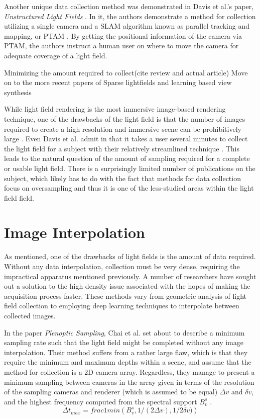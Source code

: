 \documentclass[12pt]{report}
\begin{document}
Another unique data collection method was demonstrated in Davis et al.'s paper, \emph{Unstructured Light Fields} \cite{Davis12}. In it, the authors demonstrate a method for collection utilizing a single camera and a SLAM algorithm known as parallel tracking and mapping, or PTAM \cite{Klein07}. By getting the positional information of the camera via PTAM, the authors instruct a human user on where to move the camera for adequate coverage of a light field. 

Minimizing the amount required to collect(cite review and actual article)
Move on to the more recent papers of Sparse lightfields and learning 
based view synthesis

\cite{Ng06}
\cite{Davis12}
\cite{Oberlin16}


While light field rendering is the most immersive image-based rendering technique, one of the drawbacks of the light field is that the number of images required to create a high resolution and immersive scene can be prohibitively large \cite{Anderson16}. Even Davis et al. admit in \cite{Davis12} that it takes a user several minutes to collect the light field for a subject with their relatively streamlined technique \cite{Davis12}. This leads to the natural question of the amount of sampling required for a complete or usable light field. There is a surprisingly limited number of publications on the subject, which likely has to do with the fact that methods for data collection focus on oversampling and thus it is one of the less-studied areas within the light field field.

\section{Image Interpolation}
As mentioned, one of the drawbacks of light fields is the amount of data required. Without any data interpolation, collection must be very dense, requiring the impractical apparatus mentioned previously. A number of researchers have sought out a solution to the high density issue associated with the hopes of making the acquisition process faster. These methods vary from geometric analysis of light field collection to employing deep learning techniques to interpolate between collected images.

In the paper \emph{Plenoptic Sampling}, Chai et al. set about to describe a minimum sampling rate such that the light field might be completed without any image interpolation. Their method suffers from a rather large flaw, which is that they require the minimum and maximum depths within a scene, and assume that the method for collection is a 2D camera array. Regardless, they manage to present a minimum sampling between cameras in the array given in terms of the resolution of the sampling cameras and renderer (which is assumed to be equal) $\Delta v$ and $\delta v$, and the highest frequency computed from the spectral support $B_v^s$ \cite{Chai00}. 
\begin{equation}
\Delta t_{max} = frac{1}{min \left(B_v^s, 1/(2 \Delta v), 1/2 \delta v)\right) }
\end{equation}
\end{document}
